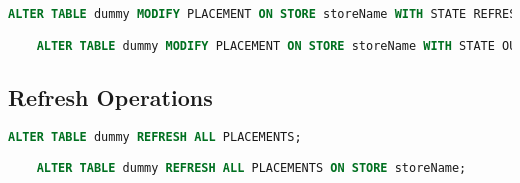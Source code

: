 \begin{lstlisting}[language=sql]
    ALTER TABLE dummy MODIFY PLACEMENT ON STORE storeName WITH STATE REFRESHABLE;

    ALTER TABLE dummy MODIFY PLACEMENT ON STORE storeName WITH STATE OUTDATED;
\end{lstlisting}


\tocless\subsection{Refresh Operations}

\begin{lstlisting}[language=sql]
    ALTER TABLE dummy REFRESH ALL PLACEMENTS;

    ALTER TABLE dummy REFRESH ALL PLACEMENTS ON STORE storeName;
\end{lstlisting}
